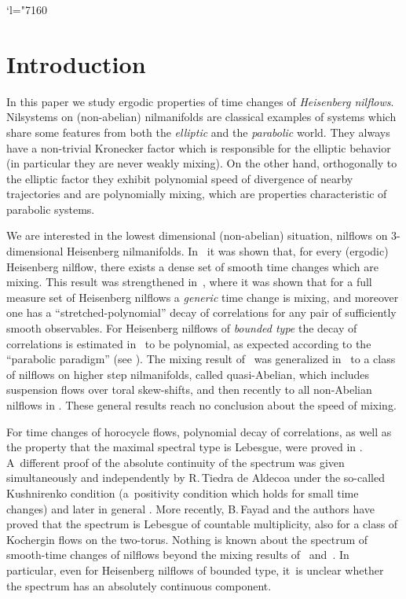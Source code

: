 \documentclass[JEP,XML,SOM,Unicode,NoEqCountersInSection]{cedram}
\newcommand{\Changel}{\mathcode`l="7160}
\theoremstyle{definition}
\theoremstyle{plain}
\begin{document}
\maketitle
\tableofcontents


\Changel
\section{Introduction}
In this paper we study ergodic properties of time changes of \emph{Heisenberg nilflows}. Nilsystems on (non-abelian) nilmanifolds are classical examples of systems which share some features from both the \emph{elliptic} and the \emph{parabolic} world. They always have a non-trivial Kronecker factor which is responsible for the elliptic behavior (in particular they are never weakly mixing). On the other hand, orthogonally to the elliptic factor they exhibit
polynomial speed of divergence of nearby trajectories and are polynomially mixing, which are properties characteristic of parabolic systems.

We are interested in the lowest dimensional (non-abelian) situation, \ie nilflows on $3$-dimensional Heisenberg nilmanifolds. In~\cite{AFU} it was shown that, for every (\hbox{ergodic}) Heisenberg nilflow, there exists a dense set of smooth time changes which are mixing. This result was strengthened in~\cite{FK}, where it was shown that for a full measure set of Heisenberg nilflows a \emph{generic} time change is mixing, and moreover one has a ``stretched-polynomial'' decay of correlations for any pair of sufficiently smooth observables. For Heisenberg nilflows of \emph{bounded type} the decay of correlations is estimated in~\cite{FK} to be polynomial, as expected according to the
``parabolic paradigm'' (see \cite[\S8.2.f]{HK}). The mixing result of~\cite{AFU} was generalized in~\cite{Rav} to a class of nilflows on higher step nilmanifolds, called quasi-Abelian, which includes suspension flows over toral skew-shifts, and then recently to all non-Abelian nilflows in \cite{AFRU}. These general results reach no conclusion about the speed of mixing.

For time changes of horocycle flows, polynomial decay of correlations, as well as the property that the maximal spectral type is Lebesgue, were proved in \cite{FU}. A~different proof of the absolute continuity of the spectrum
was given simultaneously and independently by R.\,Tiedra de Aldecoa \cite{Tie1} under the so-called Kushnirenko condition (a~positivity condition which holds for small time changes) and later in general \cite{Tie2}.
More recently, B.\,Fayad and the authors \cite{FFK} have proved that the spectrum is Lebesgue of countable multiplicity, also for a class of Kochergin flows on the two-torus. Nothing is known about the spectrum of smooth-time changes of nilflows beyond the mixing results of~\cite{AFU} and~\cite{FK}. In particular, even for Heisenberg nilflows of bounded type, it~is unclear whether the spectrum has an absolutely continuous component.
\end{document}
